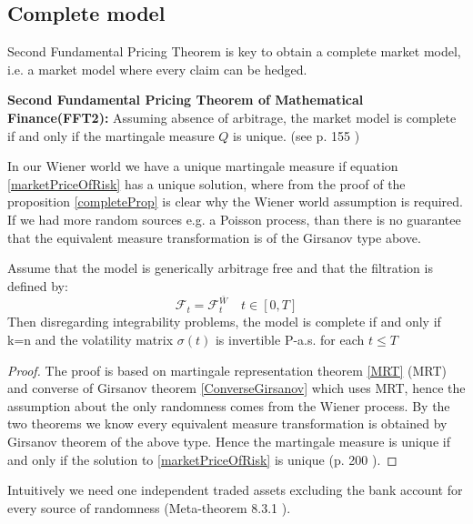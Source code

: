\subsection{Complete model}
Second Fundamental Pricing Theorem is key to obtain a complete market model, i.e. a market model where every claim can be hedged.
\begin{theorem}\label{FFT2}
\textbf{Second Fundamental Pricing Theorem of Mathematical Finance(FFT2): } Assuming absence of arbitrage, the market model is complete if and only if the martingale measure $Q$ is unique.
(see p. 155 \parencite{finKont})
\end{theorem}
In our Wiener world we have a unique martingale measure if equation \ref{marketPriceOfRisk} has a unique solution, where from the proof of the proposition \ref{completeProp} is clear why the Wiener world assumption is required. If we had more random sources e.g. a Poisson process, than there is no guarantee that the equivalent measure transformation is of the Girsanov type above. 

\begin{proposition}{}\label{completeProp}
Assume that the model is generically arbitrage free and that the filtration is defined by:
$$\mathcal{F}_t=\mathcal{F}_t^{\bar{W}} \quad t \in [0,T]$$
Then disregarding integrability problems, the model is complete if and only if k=n and the volatility matrix $\sigma(t)$ is invertible P-a.s. for each $t \leq T$
\begin{proof}
The proof is based on martingale representation theorem \ref{MRT} (MRT) and converse of Girsanov theorem \ref{ConverseGirsanov} which uses MRT, hence the assumption about the only randomness comes from the Wiener process. By the two theorems we know every equivalent measure transformation is obtained by Girsanov theorem of the above type. Hence the martingale measure is unique if and only if the solution to \eqref{marketPriceOfRisk} is unique (p. 200 \parencite{finKont}).                                         
\end{proof}
\end{proposition}
Intuitively we need one independent traded assets excluding the bank account for every source of randomness (Meta-theorem 8.3.1 \parencite{finKont}).


